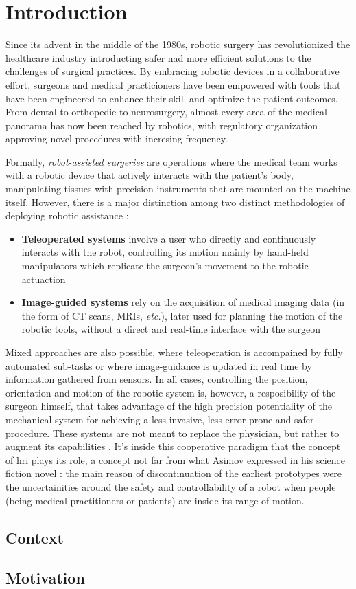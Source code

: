 \documentclass[../main.tex]{subfiles}
\begin{document}
\section{Introduction}
Since its advent in the middle of the 1980s, robotic surgery has revolutionized the healthcare industry introducting safer nad more efficient solutions to the challenges of surgical practices. By embracing robotic devices in a collaborative effort, surgeons and medical practicioners have been empowered with tools that have been engineered to enhance their skill and optimize the patient outcomes. 
From dental to orthopedic to neurosurgery, almost every area of the medical panorama has now been reached by robotics, with regulatory organization approving novel procedures with incresing frequency.

Formally, \textit{robot-assisted surgeries} are operations where the medical team works with a robotic device that actively interacts with the patient's body, manipulating tissues with precision instruments that are mounted on the machine itself. 
However, there is a major distinction among two distinct methodologies of deploying robotic assistance \cite{Hoeckelmann2015}:
\begin{itemize}
    \item \textbf{Teleoperated systems} involve a user who directly and continuously interacts with the robot, controlling its motion mainly by hand-held manipulators which replicate the surgeon's movement to the robotic actuaction
    \item \textbf{Image-guided systems} rely on the acquisition of medical imaging data (in the form of CT scans, MRIs, \textit{etc.}), later used for planning the motion of the robotic tools, without a direct and real-time interface with the surgeon
\end{itemize}
Mixed approaches are also possible, where teleoperation is accompained by fully automated sub-tasks or where image-guidance is updated in real time by information gathered from sensors. 
In all cases, controlling the position, orientation and motion of the robotic system is, however, a resposibility of the surgeon himself, that takes advantage of the high precision potentiality of the mechanical system for achieving a less invasive, less error-prone and safer procedure. These systems are not meant to replace the physician, but rather to augment its capabilities \cite{Cleary2001}. It's inside this cooperative paradigm that the concept of \ac{hri} plays its role, a concept not far from what Asimov expressed in his science fiction novel \cite{Asimov1950}: the main reason of discontinuation of the earliest prototypes were the uncertainities around the safety and controllability of a robot when people (being medical practitioners or patients) are inside its range of motion. 


\subsection{Context}

\subsection{Motivation}
\textit{}



\end{document}
